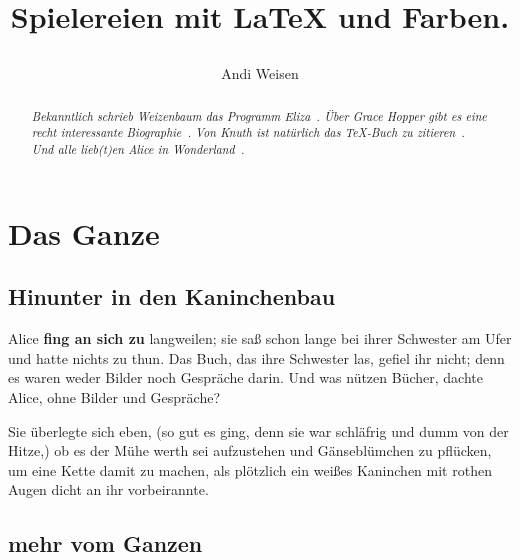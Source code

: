 \documentclass[DIV=calc,10pt,parskip=half,twocolumn]{scrartcl}
\author{Andi Weisen}
\begin{document}
\title{
\vspace{-1.5em}
\begin{tcolorbox}[colframe=meerblau,top=12pt,bottom=12pt,colback=meerblau,sharp corners,halign=center]
  \popp\fontsize{40pt}{46pt}\selectfont\color{himmelblau}Spiel{\color{gelb}ereien} {\color{flieder} mit} \LaTeX{} und {\color{mint}Farben}.
\end{tcolorbox}  
\vspace{-2.5em}
}
\author{}
\date{}


\maketitle

\begin{abstract}\itshape %
  \color{seagreen}
  Bekanntlich schrieb \glqq Weizenbaum\grqq{} das Programm Eliza~\cite{Weizenbaum1966}. 
Über Grace Hopper gibt es eine recht interessante Biographie~\cite{Beyer2009}.  
Von Knuth ist natürlich das \TeX{}-Buch zu zitieren~\cite{Knuth1984}. 
Und alle lieb(t)en \emph{Alice in Wonderland}~\cite{CarrollLewis1904}. 
\end{abstract} 

\tableofcontents 

\section{Das Ganze}



\subsection{Hinunter in den Kaninchenbau}

Alice {\bfseries fing an sich zu} langweilen; sie saß schon lange bei ihrer Schwester am
Ufer und hatte nichts zu thun. Das Buch, das ihre Schwester las, gefiel ihr
nicht; denn es waren weder Bilder noch Gespräche darin. \grqq{} Und was nützen
Bücher,\grqq{}  dachte Alice, \grqq{}ohne Bilder und Gespräche?\grqq 

Sie überlegte sich eben, (so gut es ging, denn sie war schläfrig und dumm von
der Hitze,) ob es der Mühe werth sei aufzustehen und Gänseblümchen zu pflücken,
um eine Kette damit zu machen, als plötzlich ein weißes Kaninchen mit rothen
Augen dicht an ihr vorbeirannte.

\subsection{mehr vom Ganzen}
\end{document}
